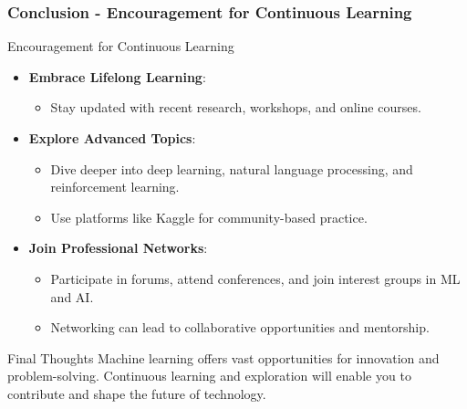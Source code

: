 \documentclass[aspectratio=169]{beamer}
\begin{document}
\begin{frame}[fragile]
    \frametitle{Conclusion - Encouragement for Continuous Learning}
    \begin{block}{Encouragement for Continuous Learning}
        \begin{itemize}
            \item \textbf{Embrace Lifelong Learning}:
            \begin{itemize}
                \item Stay updated with recent research, workshops, and online courses.
            \end{itemize}

            \item \textbf{Explore Advanced Topics}:
            \begin{itemize}
                \item Dive deeper into deep learning, natural language processing, and reinforcement learning.
                \item Use platforms like Kaggle for community-based practice.
            \end{itemize}
            
            \item \textbf{Join Professional Networks}:
            \begin{itemize}
                \item Participate in forums, attend conferences, and join interest groups in ML and AI.
                \item Networking can lead to collaborative opportunities and mentorship.
            \end{itemize}
        \end{itemize}
    \end{block}

    \begin{block}{Final Thoughts}
        Machine learning offers vast opportunities for innovation and problem-solving. Continuous learning and exploration will enable you to contribute and shape the future of technology.
    \end{block}
\end{frame}
\end{document}
